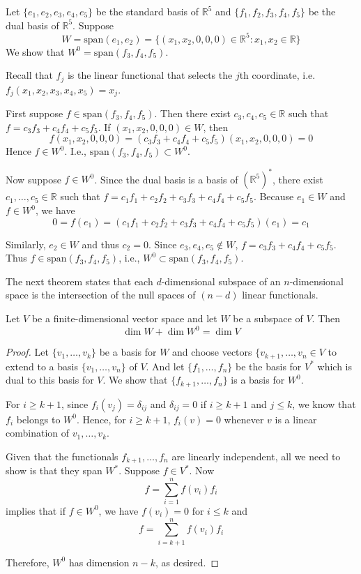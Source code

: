 \begin{example}
	Let $\{ e_1, e_2, e_3, e_4, e_5 \}$ be the standard basis of $\mathbb{R}^5$ and $\{ f_1, f_2, f_3, f_4, f_5 \}$ be the dual basis of $\mathbb{R}^5$. Suppose
	\[
		W = \text{span}(e_1, e_2) = \{ (x_1, x_2, 0, 0, 0)  \in \mathbb{R}^5 : x_1, x_2 \in \mathbb{R} \}
	\]
	We show that $W^0 = \text{span}(f_3, f_4, f_5)$.

	Recall that $f_j$ is the linear functional that selects the $j$th coordinate, i.e. $f_j(x_1, x_2, x_3, x_4, x_5) = x_j$.

	First suppose $f \in \text{span}(f_3, f_4, f_5)$. Then there exist $c_3, c_4, c_5 \in \mathbb{R}$ such that $f = c_3 f_3 + c_4 f_4 + c_5 f_5$. If $(x_1, x_2, 0, 0, 0) \in W$, then 
	\[
		f(x_1, x_2, 0, 0, 0) = (c_3 f_3 + c_4 f_4 + c_5 f_5)(x_1, x_2, 0, 0, 0) = 0
	\]
	Hence $f \in W^0$. I.e., $\text{span}(f_3, f_4, f_5) \subset W^0$.

	Now suppose $f \in W^0$. Since the dual basis is a basis of $(\mathbb{R}^5)^\ast$, there exist $c_1, \ldots, c_5 \in \mathbb{R}$ such that $f = c_1 f_1 + c_2 f_2 + c_3 f_3 + c_4 f_4 + c_5 f_5$. Because $e_1 \in W$ and $f \in W^0$, we have
	\[
		0 = f(e_1) = (c_1 f_1 + c_2 f_2 + c_3 f_3 + c_4 f_4 + c_5 f_5)(e_1) = c_1
	\]

	Similarly, $e_2 \in W$ and thus $c_2 = 0$. Since $e_3, e_4, e_5 \notin W$, $f = c_3 f_3 + c_4 f_4 + c_5 f_5$. Thus $f \in \text{span}(f_3, f_4, f_5)$, i.e., $W^0 \subset \text{span}(f_3, f_4, f_5)$.
\end{example}

The next theorem states that each $d$-dimensional subspace of an $n$-dimensional space is the intersection of the null spaces of $(n-d)$ linear functionals.

\begin{theorem}\label{thm:dim-annihilator}
	Let $V$ be a finite-dimensional vector space and let $W$ be a subspace of $V$. Then
	\[
		\dim W + \dim W^0 = \dim V
	\]
\end{theorem}

\begin{proof}
	Let $\{ v_1, \ldots, v_k \}$ be a basis for $W$ and choose vectors $\{ v_{k+1}, \ldots, v_n \in V$ to extend to a basis $\{ v_1, \ldots, v_n \}$ of $V$. And let $ \{ f_1, \ldots, f_n \}$ be the basis for $V^\ast$ which is dual to this basis for $V$. We show that $\{ f_{k+1}, \ldots, f_n \}$ is a basis for $W^0$.

	For $i \geq k+1$, since $f_i(v_j) = \delta_{ij}$ and $\delta_{ij} = 0$ if $i \geq k+1$ and $j \leq k$, we know that $f_i$ belongs to $W^0$. Hence, for $i \geq k+1$,  $f_i(v) = 0$ whenever $v$ is a linear combination of $v_1, \ldots, v_k$.

	Given that the functionals $f_{k+1}, \ldots, f_n$ are linearly independent, all we need to show is that they span $W^\ast$. Suppose $f \in V^\ast$. Now 
	\[
		f = \sum_{i=1}^n f(v_i)f_i
	\]
	implies that if $f \in W^0$, we have $f(v_i) = 0$ for $i \leq k$ and
	\[
		f = \sum_{i = k+1}^n f(v_i) f_i
	\]

	Therefore, $W^0$ has dimension $n-k$, as desired.
\end{proof}

